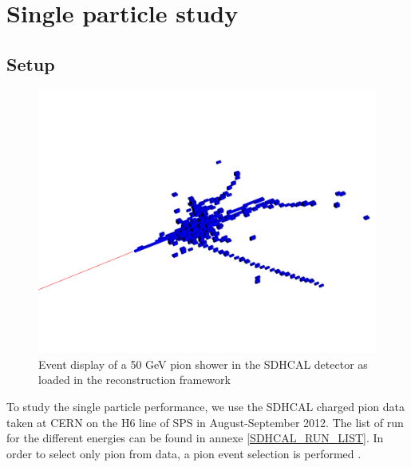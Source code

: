 \documentclass[cits]{JINST}
\begin{document}
\section{Single particle study}
\label{SINGLE_PARTICLE_STUDY_SECTION}

\subsection{Setup}

\begin{figure}
  \vspace{-20pt}
  \begin{center}
    \includegraphics[width=\linewidth]{SingleParticleSetup.pdf}
  \end{center}
  \vspace{-10pt}
  \caption{\label{ARBOR_SINGLE_PARTICLE_SETUP} Event display of a 50 GeV pion shower in the SDHCAL detector as loaded in the reconstruction framework}
\end{figure}

To study the single particle performance, we use the SDHCAL charged pion data taken at CERN on the H6 line of SPS in August-September 2012. The list of run for the different energies can be found in annexe \ref{SDHCAL_RUN_LIST}. In order to select only pion from data, a pion event selection is performed \cite{sdhcal-paper}.
\end{document}
